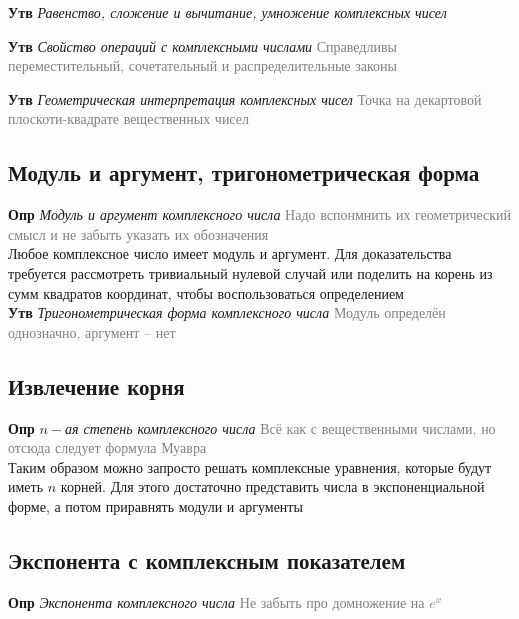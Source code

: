\documentclass[a4paper, 14pt]{article}
\begin{document}
    \textbf{Утв} \textit{Равенство, сложение и вычитание, умножение комплексных чисел}

    \textbf{Утв} \textit{Свойство операций с комплексными числами} \textcolor{gray}{Справедливы переместительный,
        сочетательный и распределительные законы}

    \textbf{Утв} \textit{Геометрическая интерпретация комплексных чисел} \textcolor{gray}{Точка на декартовой
    плоскоти-квадрате вещественных чисел}

    \subsection{Модуль и аргумент, тригонометрическая форма}

    \textbf{Опр} \textit{Модуль и аргумент комплексного числа} \textcolor{gray}{Надо вспонмнить их геометрический
    смысл и не забыть указать их обозначения} \\

    Любое комплексное число имеет модуль и аргумент.
    Для доказательства требуется рассмотреть тривиальный нулевой
    случай или поделить на корень из сумм квадратов координат, чтобы воспользоваться определением \\

    \textbf{Утв} \textit{Тригонометрическая форма комплексного числа} \textcolor{gray}{Модуль определён однозначно,
        аргумент -- нет}

    \subsection{Извлечение корня}

    \textbf{Опр} \textit{$n-$ая степень комплексного числа} \textcolor{gray}{Всё как с вещественными числами, но
    отсюда следует формула Муавра} \\

    Таким образом можно запросто решать комплексные уравнения, которые будут иметь $n$ корней.
    Для этого достаточно
    представить числа в экспоненциальной форме, а потом приравнять модули и аргументы

    \subsection{Экспонента с комплексным показателем}

    \textbf{Опр} \textit{Экспонента комплексного числа} \textcolor{gray}{Не забыть про домножение на $e^x$}
\end{document}
